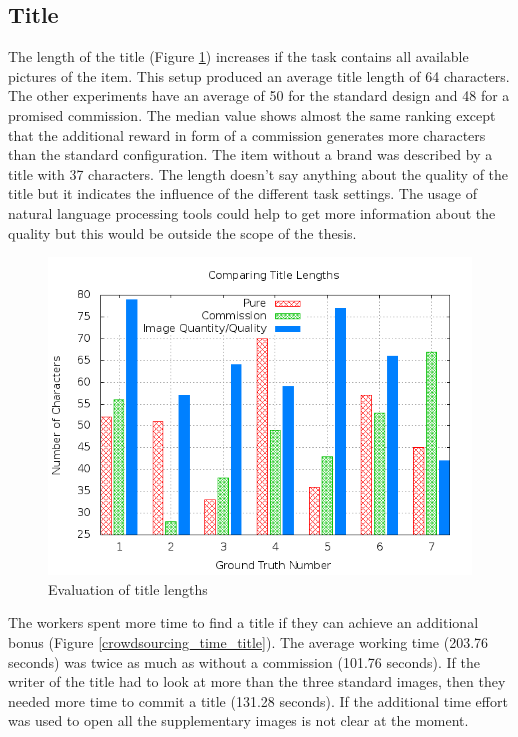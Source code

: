 \subsection{Title}
The length of the title (Figure \ref{crowdsourcing_title_length}) increases if the task contains all available pictures of the item. This setup produced an average title length of 64 characters. The other experiments have an average of 50 for the standard design and 48 for a promised commission. The median value shows almost the same ranking except that the additional reward in form of a commission generates more characters than the standard configuration. The item without a brand was described by a title with 37 characters. The length doesn't say anything about the quality of the title but it indicates the influence of the different task settings. The usage of natural language processing tools could help to get more information about the quality but this would be outside the scope of the thesis.
\begin{figure}
\centering
\includegraphics[scale=0.55]{images/plots/crowdsourcing/plot_title_length.png}
\caption{Evaluation of title lengths}
\label{crowdsourcing_title_length}
\end{figure}
The workers spent more time to find a title if they can achieve an additional bonus (Figure \ref{crowdsourcing_time_title}). The average working time (203.76 seconds) was twice as much as without a commission (101.76 seconds). If the writer of the title had to look at more than the three standard images, then they needed more time to commit a title (131.28 seconds). If the additional time effort was used to open all the supplementary images is not clear at the moment.

